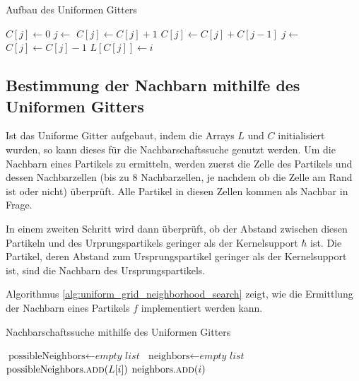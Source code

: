 \documentclass{scrreprt}
\begin{document}
\begin{algorithm}
    \caption{Aufbau des Uniformen Gitters}
    \label{alg:uniform_grid_initialization}
    \begin{algorithmic}[1]
            \State $C[j] \gets 0$
        \EndFor
            \State $j \gets$ 
            \State $C[j] \gets C[j] + 1$
        \EndFor
            \State $C[j] \gets C[j] + C[j-1]$
        \EndFor
            \State $j \gets$ 
            \State $C[j] \gets C[j] - 1$
            \State $L[C[j]] \gets i$
        \EndFor
    \end{algorithmic}
\end{algorithm}


\subsection{Bestimmung der Nachbarn mithilfe des Uniformen Gitters}
Ist das Uniforme Gitter aufgebaut, indem die Arrays $L$ und $C$ initialisiert wurden, so kann dieses für die Nachbarschaftssuche genutzt werden.
Um die Nachbarn eines Partikels zu ermitteln,
werden zuerst die Zelle des Partikels und dessen Nachbarzellen (bis zu 8 Nachbarzellen, je nachdem ob die Zelle am Rand ist oder nicht) überprüft.
Alle Partikel in diesen Zellen kommen als Nachbar in Frage.

In einem zweiten Schritt wird dann überprüft, ob der Abstand zwischen diesen Partikeln und des Urprungspartikels geringer als der Kernelsupport $\hbar$ ist.
Die Partikel, deren Abstand zum Ursprungspartikel geringer als der Kernelsupport ist, sind die Nachbarn des Ursprungspartikels.

Algorithmus \ref{alg:uniform_grid_neighborhood_search} zeigt, wie die Ermittlung der Nachbarn eines Partikels $f$ implementiert werden kann.

\begin{algorithm}
    \caption{Nachbarschaftssuche mithilfe des Uniformen Gitters}
    \label{alg:uniform_grid_neighborhood_search}
    \begin{algorithmic}[1]
        \State $\text{possibleNeighbors} \gets \textit{empty list}$
        \State $\text{neighbors} \gets \textit{empty list}$
                \State $\text{possibleNeighbors.} \Call{add}{L[i]}$
            \EndFor
        \EndFor
            \State $\text{neighbors.} \Call{add}{i}$
            \EndIf
        \EndFor
    \end{algorithmic}
\end{algorithm}
\end{document}
